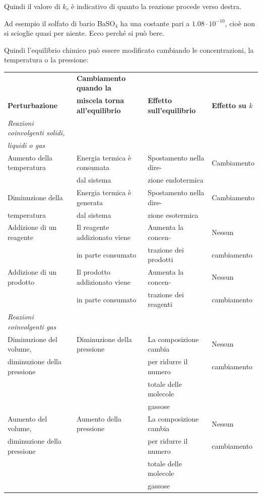 \vspace{0.2cm}Quindi il valore di $k_c$ è indicativo di quanto la reazione procede verso destra.

Ad esempio il solfato di bario BaSO$_4$ ha una costante pari a $1.08 \cdot 10^{-10}$, cioè non si scioglie quasi per niente. Ecco perché si può bere.

Quindi l'equilibrio chimico può essere modificato cambiando le concentrazioni, la temperatura o la pressione:
\vspace{0.2cm}\begin{center}
\scriptsize\begin{tabular}{|l|l|l|l|}
    \hline
    & \textbf{Cambiamento quando la} &  &\\
    \textbf{Perturbazione} & \textbf{miscela torna all'equilibrio} & \textbf{Effetto sull'equilibrio} & \textbf{Effetto su $k$}\\
    \hline
    \textit{Reazioni coinvolgenti solidi,}&&&\\
    \textit{liquidi o gas} &&&\\[0.5ex]
    \hline
    Aumento della temperatura & Energia termica è consumata & Spostamento nella dire- & Cambiamento\\
    & dal sistema & zione endotermica &\\[0.5ex]
    \hline
    Diminuzione della & Energia termica è generata & Spostamento nella dire- & Cambiamento\\
    temperatura & dal sistema & zione esotermica &\\
    \hline
    Addizione di un reagente & Il reagente addizionato viene & Aumenta la concen- & Nessun\\
    & in parte consumato & trazione dei prodotti & cambiamento\\[0.5ex]
    \hline
    Addizione di un prodotto & Il prodotto addizionato viene & Aumenta la concen- & Nessun\\
    & in parte consumato & trazione dei reagenti & cambiamento\\[0.5ex]
    \hline
    \textit{Reazioni coinvolgenti gas} &&&\\[0.5ex]
    \hline
    Diminuzione del volume, & Diminuzione della pressione & La composizione cambia & Nessun\\
    diminuzione della pressione & & per ridurre il numero &cambiamento\\
    &&totale delle molecole&\\
    &&gassose&\\[0.5ex]
    \hline
    Aumento del volume, & Aumento della pressione & La composizione cambia & Nessun\\
    diminuzione della pressione & & per ridurre il numero &cambiamento\\
    &&totale delle molecole&\\
    &&gassose&\\
    \hline
\end{tabular}
\end{center}

